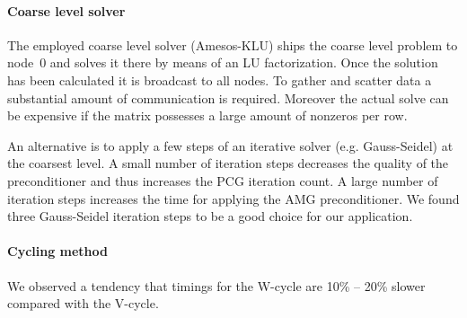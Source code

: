 \paragraph{Coarse level solver} The employed coarse level solver
(Amesos-KLU) ships the coarse level problem to node~0 and solves it
there by means of an LU factorization.  Once the solution has been
calculated it is broadcast to all nodes.  To gather and scatter data a
substantial amount of communication is required.  Moreover the actual
solve can be expensive if the matrix possesses a large amount of
nonzeros per row.

An alternative is to apply a few steps of an iterative solver (e.g.
Gauss-Seidel) at the coarsest level.  A small number of iteration steps
decreases the quality of the preconditioner and thus increases the PCG
iteration count.  A large number of iteration steps increases the time
for applying the AMG preconditioner.  We found three Gauss-Seidel
iteration steps to be a good choice for our application.

\paragraph{Cycling method} We observed a tendency that timings for the
W-cycle are 10\% -- 20\% slower compared with the V-cycle.

